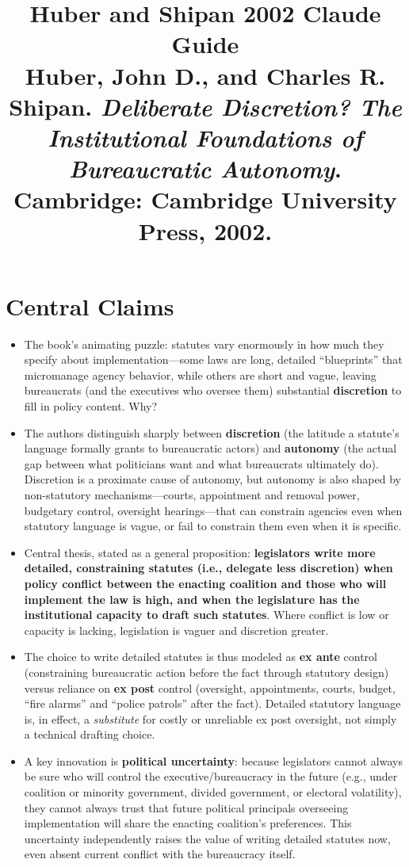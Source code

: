 \documentclass[12pt]{article}
\title{\textbf{Huber and Shipan 2002 Claude Guide}\\
\large Huber, John D., and Charles R. Shipan. \textit{Deliberate Discretion? The Institutional Foundations of Bureaucratic Autonomy}.\\
Cambridge: Cambridge University Press, 2002.}
\author{}
\date{}
\begin{document}
\maketitle
\tableofcontents
\newpage

\section{Central Claims}

\begin{itemize}[leftmargin=*, itemsep=4pt]
    \item The book's animating puzzle: statutes vary enormously in how much they specify about implementation---some laws are long, detailed ``blueprints'' that micromanage agency behavior, while others are short and vague, leaving bureaucrats (and the executives who oversee them) substantial \textbf{discretion} to fill in policy content. Why?
    \item The authors distinguish sharply between \textbf{discretion} (the latitude a statute's language formally grants to bureaucratic actors) and \textbf{autonomy} (the actual gap between what politicians want and what bureaucrats ultimately do). Discretion is a proximate cause of autonomy, but autonomy is also shaped by non-statutory mechanisms---courts, appointment and removal power, budgetary control, oversight hearings---that can constrain agencies even when statutory language is vague, or fail to constrain them even when it is specific.
    \item Central thesis, stated as a general proposition: \textbf{legislators write more detailed, constraining statutes (i.e., delegate less discretion) when policy conflict between the enacting coalition and those who will implement the law is high, and when the legislature has the institutional capacity to draft such statutes}. Where conflict is low or capacity is lacking, legislation is vaguer and discretion greater.
    \item The choice to write detailed statutes is thus modeled as \textbf{ex ante} control (constraining bureaucratic action before the fact through statutory design) versus reliance on \textbf{ex post} control (oversight, appointments, courts, budget, ``fire alarms'' and ``police patrols'' after the fact). Detailed statutory language is, in effect, a \emph{substitute} for costly or unreliable ex post oversight, not simply a technical drafting choice.
    \item A key innovation is \textbf{political uncertainty}: because legislators cannot always be sure who will control the executive/bureaucracy in the future (e.g., under coalition or minority government, divided government, or electoral volatility), they cannot always trust that future political principals overseeing implementation will share the enacting coalition's preferences. This uncertainty independently raises the value of writing detailed statutes now, even absent current conflict with the bureaucracy itself.

\end{itemize}
\end{document}

